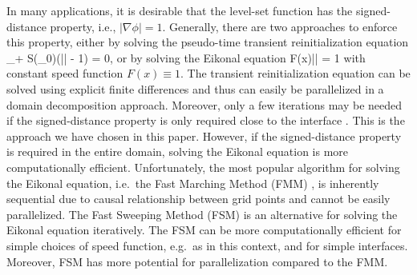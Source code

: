 In many applications, it is desirable that the level-set function has the signed-distance property, i.e., $|\nabla \phi| = 1$. Generally, there are two approaches to enforce this property, either by solving the pseudo-time transient reinitialization equation \cite{Sussman;Smereka;Osher:94:A-Level-Set-Approach, Osher;Fedkiw:01:Level-Set-Methods:-A}
\ben
\phi_\tau + S(\phi_0)\left(|\nabla \phi| - 1\right) = 0,
\een
or by solving the Eikonal equation
\ben
F(x)|\nabla\phi| = 1
\een 
with constant speed function $F(x) \equiv 1$. The transient reinitialization equation can be solved using explicit finite differences and thus can easily be parallelized in a domain decomposition approach. Moreover, only a few iterations may be needed if the signed-distance property is only required close to the interface \cite{Min;Gibou:07:A-second-order-accur}. This is the approach we have chosen in this paper. However, if the signed-distance property is required in the entire domain, solving the Eikonal equation is more computationally efficient. Unfortunately, the most popular algorithm for solving the Eikonal equation, i.e.\ the Fast Marching Method (FMM) \cite{Sethian:96:A-Fast-Marching-Leve,Sethian:99:Level-set-methods-an}, is inherently sequential due to causal relationship between grid points and cannot be easily parallelized.
The Fast Sweeping Method (FSM) \cite{Zhao:05:A-fast-sweeping-meth} is an
alternative for solving the Eikonal equation iteratively.
The FSM can be more computationally efficient for simple choices of speed
function, e.g.\ as in this context, and for simple interfaces.
Moreover, FSM has more potential for parallelization compared to the FMM.

